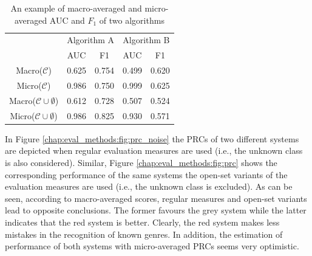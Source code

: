 \begin{table}[t]
	\center
	\caption{An example of macro-averaged and micro-averaged AUC and $F_{1}$ of two algorithms}\label{chap:eval_methods:tbl:AUC_F1}
	\begin{tabular}{c c c c c}
		\cline{2-5}
		& \multicolumn{2}{|c|}{Algorithm A} & \multicolumn{2}{c|}{Algorithm B} \\
		\cline{2-5}
		& \multicolumn{1}{|c}{AUC} & \multicolumn{1}{c|}{F1} & \multicolumn{1}{c}{AUC} & \multicolumn{1}{c|}{F1} \\
		\hline
		\multicolumn{1}{|c}{Macro($\mathcal{C}$)} & \multicolumn{1}{|c}{0.625} & \multicolumn{1}{c|}{0.754} & 0.499 & \multicolumn{1}{c|}{0.620}\\
		\multicolumn{1}{|c}{Micro($\mathcal{C}$)} & \multicolumn{1}{|c}{0.986} & \multicolumn{1}{c|}{0.750} & 0.999 & \multicolumn{1}{c|}{0.625}\\
		\hline
		\multicolumn{1}{|c}{Macro($\mathcal{C} \cup \emptyset$)} & \multicolumn{1}{|c}{0.612} & \multicolumn{1}{c|}{0.728} & 0.507 & \multicolumn{1}{c|}{0.524}\\	
		\multicolumn{1}{|c}{Micro($\mathcal{C} \cup \emptyset$)} & \multicolumn{1}{|c}{0.986} & \multicolumn{1}{c|}{0.825} & 0.930 & \multicolumn{1}{c|}{0.571}\\
		\hline
	\end{tabular}
\end{table}

In Figure \ref{chap:eval_methods:fig:prc_noise} the PRCs of two different systems are depicted when regular evaluation measures are used (i.e., the unknown class is also considered). Similar, Figure \ref{chap:eval_methods:fig:prc} shows the corresponding performance of the same systems the open-set variants of the evaluation measures are used (i.e., the unknown class is excluded). As can be seen, according to macro-averaged scores, regular measures and open-set variants lead to opposite conclusions. The former favours the grey system while the latter indicates that the red system is better. Clearly, the red system makes less mistakes in the recognition of known genres. In addition, the estimation of performance of both systems with micro-averaged PRCs seems very optimistic.

